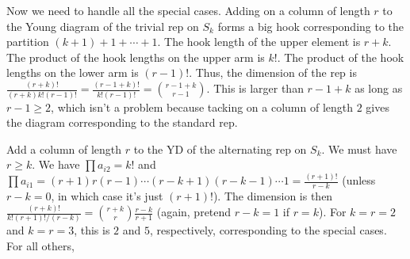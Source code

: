 \documentclass{article}
\begin{document}
Now we need to handle all the special cases. Adding on a column of length $r$ to the Young diagram of the trivial rep on $S_k$ forms a big hook corresponding to the partition $(k+1)+1+\cdots+1$. The hook length of the upper element is $r+k$. The product of the hook lengths on the upper arm is $k!$. The product of the hook lengths on the lower arm is $(r-1)!$. Thus, the dimension of the rep is $\frac{(r+k)!}{(r+k)k!(r-1)!}=\frac{(r-1+k)!}{k!(r-1)!}=\binom{r-1+k}{r-1}$. This is larger than $r-1+k$ as long as $r-1\geq2$, which isn't a problem because tacking on a column of length $2$ gives the diagram corresponding to the standard rep.

Add a column of length $r$ to the YD of the alternating rep on $S_k$. We must have $r\geq k$. We have $\prod a_{i2}=k!$ and $\prod a_{i1}=(r+1)r(r-1)\cdots(r-k+1)(r-k-1)\cdots1=\frac{(r+1)!}{r-k}$ (unless $r-k=0$, in which case it's just $(r+1)!$). The dimension is then $\frac{(r+k)!}{k!(r+1)!/(r-k)}=\binom{r+k}{r}\frac{r-k}{r+1}$ (again, pretend $r-k=1$ if $r=k$). For $k=r=2$ and $k=r=3$, this is $2$ and $5$, respectively, corresponding to the special cases. For all others, 
\end{document}
